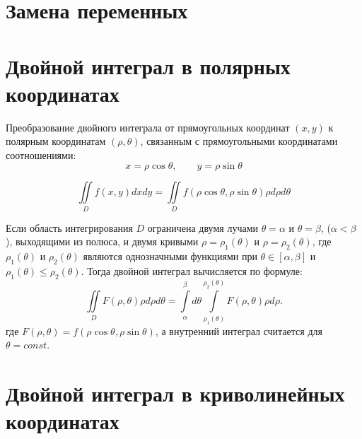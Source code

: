 \documentclass[a4paper,12pt,oneside]{extbook}
\theoremstyle{numbered}
\theoremstyle{unnumbered}
\theoremstyle{named}
\theoremstyle{unnumbered}
\theoremstyle{named}
\theoremstyle{named}
\theoremstyle{named}
\begin{document}

\section{Замена переменных}
\label{sec:Замена переменных}


\section{Двойной интеграл в полярных координатах}
\label{sec:Двойной интеграл в полярных координатах}

Преобразование двойного интеграла от прямоугольных координат \((x, y)\) к полярным координатам \((\rho, \theta)\), связанным с прямоугольными координатами соотношениями:
\begin{equation}
    x = \rho \cos{\theta}, \qquad y = \rho \sin{\theta}
\end{equation}

\begin{equation}
    \iint\limits_{D} f(x, y)dxdy = \iint\limits_{D} f(\rho \cos{\theta}, \rho \sin{\theta}) \rho d\rho d\theta
\end{equation}

Если область интегрирования \(D\) ограничена двумя лучами \(\theta = \alpha\) и \(\theta = \beta\), (\(\alpha < \beta\)), выходящими из полюса, и двумя кривыми \(\rho = \rho_1(\theta)\) и \(\rho = \rho_2(\theta)\), где \(\rho_1(\theta)\) и \(\rho_2(\theta)\) являются однозначными функциями при \(\theta \in [\alpha, \beta]\) и \(\rho_1(\theta) \leq \rho_2(\theta)\). Тогда двойной интеграл вычисляется по формуле:
\begin{equation}
    \iint\limits_{D} F(\rho, \theta) \rho d\rho d\theta = \int\limits_{\alpha}^{\beta} d\theta \int\limits_{\rho_1(\theta)}^{\rho_2(\theta)} F(\rho, \theta) \rho d\rho.
\end{equation}
где \(F(\rho, \theta) = f(\rho \cos{\theta}, \rho \sin{\theta})\), а внутренний интеграл считается для \(\theta = const\).

\section{Двойной интеграл в криволинейных координатах}
\label{sec:Двойной интеграл в криволинейных координатах}
\end{document}
